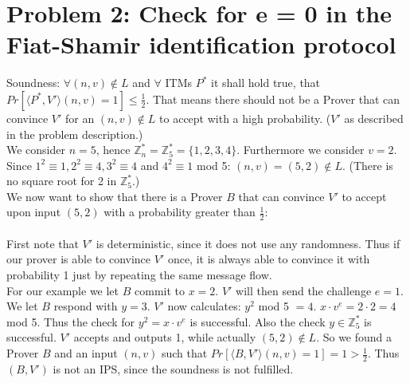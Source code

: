 \documentclass[12pt,pdftex,a4paper]{article}
\begin{document}
\section*{Problem 2: Check for e = 0 in the Fiat-Shamir identification protocol}
Soundness: $\forall	(n, v) \notin L$ and $\forall$ ITMs $P^*$ it shall hold true, that $Pr[\langle P^*, V'\rangle (n, v) = 1]\leq \frac{1}{2}$. That means there should not be a Prover that can convince $V'$ for an $(n, v)\notin L$ to accept with a high probability. ($V'$ as described in the problem description.)\\
We consider $n=5$, hence $\mathbb{Z}_{n}^* = \mathbb{Z}_{5}^* = \{1, 2, 3, 4\}$. Furthermore we consider $v = 2$. Since $1^2\equiv 1, 2^2\equiv 4, 3^2\equiv 4$ and $4^2\equiv 1$ mod 5: $(n, v) = (5, 2) \notin L$. (There is no square root for 2 in $\mathbb{Z}_5^*$.)\\
We now want to show that there is a Prover $B$ that can convince $V'$ to accept upon input $(5, 2)$ with a probability greater than $\frac{1}{2}$:\\~\\
First note that $V'$ is deterministic, since it does not use any randomness. Thus if our prover is able to convince $V'$ once, it is always able to convince it with probability 1 just by repeating the same message flow.\\
For our example we let $B$ commit to $x=2$. $V'$ will then send the challenge $e=1$. We let $B$ respond with $y=3$. $V'$ now calculates: $y^2$ mod 5 $=4$. $x\cdot v^e = 2\cdot 2 = 4$ mod 5. Thus the check for $y^2 = x\cdot v^e$ is successful. Also the check $y\in \mathbb{Z}_5^*$ is successful. $V'$ accepts and outputs 1, while actually $(5, 2) \notin L$.
So we found a Prover $B$ and an input $(n, v)$ such that $Pr[\langle B, V'\rangle (n, v) = 1]=1>\frac{1}{2}$. Thus $(B, V')$ is not an IPS, since the soundness is not fulfilled.
\end{document}
